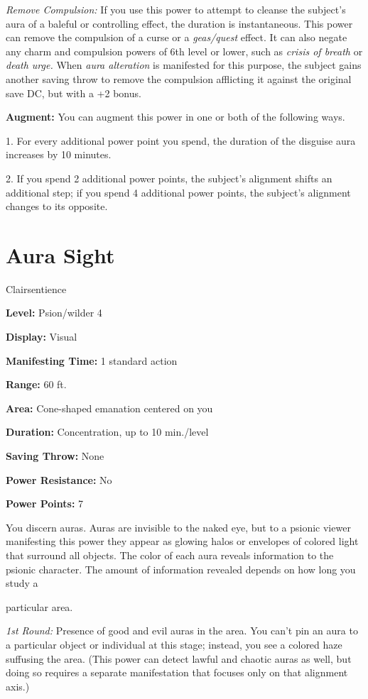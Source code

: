 \documentclass{article}
\begin{document}
\textit{Remove Compulsion: }If you use this power to attempt to cleanse the subject's 
aura of a baleful or controlling effect, the duration is instantaneous. This power 
can remove the compulsion of a curse or a \textit{geas/quest }effect. It can also 
negate any charm and compulsion powers of 6th level or lower, such as \textit{crisis 
of breath }or \textit{death urge. }When \textit{aura alteration }is manifested 
for this purpose, the subject gains another saving throw to remove the compulsion 
afflicting it against the original save DC, but with a +2 bonus.

\textbf{Augment:} You can augment this power in one or both of the following ways.

1. For every additional power point you spend, the duration of the disguise aura 
increases by 10 minutes.

2. If you spend 2 additional power points, the subject's alignment shifts an additional 
step; if you spend 4 additional power points, the subject's alignment changes to 
its opposite.

\vspace{12pt}
\section*{Aura Sight}

Clairsentience

\textbf{Level:} Psion/wilder 4

\textbf{Display:} Visual

\textbf{Manifesting Time:} 1 standard action

\textbf{Range:} 60 ft.

\textbf{Area:} Cone-shaped emanation centered on you

\textbf{Duration:} Concentration, up to 10 min./level

\textbf{Saving Throw:} None

\textbf{Power Resistance:} No

\textbf{Power Points:} 7

You discern auras. Auras are invisible to the naked eye, but to a psionic viewer 
manifesting this power they appear as glowing halos or envelopes of colored light 
that surround all objects. The color of each aura reveals information to the psionic 
character. The amount of information revealed depends on how long you study a

particular area.

\textit{1st Round: }Presence of good and evil auras in the area. You can't pin 
an aura to a particular object or individual at this stage; instead, you see a 
colored haze suffusing the area. (This power can detect lawful and chaotic auras 
as well, but doing so requires a separate manifestation that focuses only on that 
alignment axis.)
\end{document}
